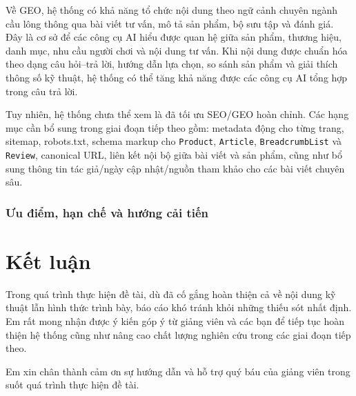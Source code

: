 \documentclass[13pt]{article}
\begin{document}
Về GEO, hệ thống có khả năng tổ chức nội dung theo ngữ cảnh chuyên ngành cầu lông thông qua bài viết tư vấn, mô tả sản phẩm, bộ sưu tập và đánh giá. Đây là cơ sở để các công cụ AI hiểu được quan hệ giữa sản phẩm, thương hiệu, danh mục, nhu cầu người chơi và nội dung tư vấn. Khi nội dung được chuẩn hóa theo dạng câu hỏi--trả lời, hướng dẫn lựa chọn, so sánh sản phẩm và giải thích thông số kỹ thuật, hệ thống có thể tăng khả năng được các công cụ AI tổng hợp trong câu trả lời.

Tuy nhiên, hệ thống chưa thể xem là đã tối ưu SEO/GEO hoàn chỉnh. Các hạng mục cần bổ sung trong giai đoạn tiếp theo gồm: metadata động cho từng trang, sitemap, robots.txt, schema markup cho \texttt{Product}, \texttt{Article}, \texttt{BreadcrumbList} và \texttt{Review}, canonical URL, liên kết nội bộ giữa bài viết và sản phẩm, cũng như bổ sung thông tin tác giả/ngày cập nhật/nguồn tham khảo cho các bài viết chuyên sâu.

\subsubsection{Ưu điểm, hạn chế và hướng cải tiến}


\section*{Kết luận}
Trong quá trình thực hiện đề tài, dù đã cố gắng hoàn thiện cả về nội dung kỹ thuật lẫn hình thức trình bày, báo cáo khó tránh khỏi những thiếu sót nhất định. 
Em rất mong nhận được ý kiến góp ý từ giảng viên và các bạn để tiếp tục hoàn thiện hệ thống cũng như nâng cao chất lượng nghiên cứu trong các giai đoạn tiếp theo.

Em xin chân thành cảm ơn sự hướng dẫn và hỗ trợ quý báu của giảng viên trong suốt quá trình thực hiện đề tài.
\end{document}
